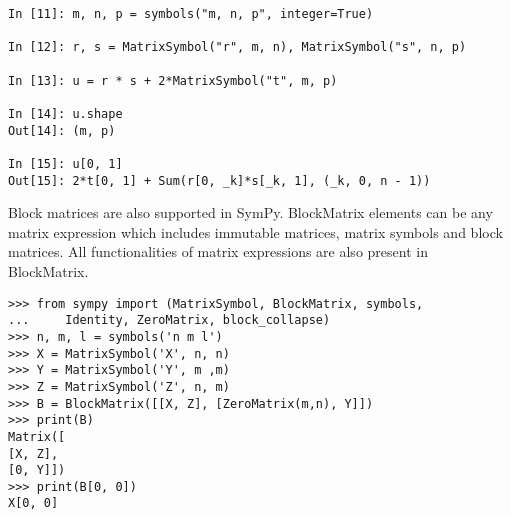 \begin{verbatim}
In [11]: m, n, p = symbols("m, n, p", integer=True)

In [12]: r, s = MatrixSymbol("r", m, n), MatrixSymbol("s", n, p)

In [13]: u = r * s + 2*MatrixSymbol("t", m, p)

In [14]: u.shape
Out[14]: (m, p)

In [15]: u[0, 1]
Out[15]: 2*t[0, 1] + Sum(r[0, _k]*s[_k, 1], (_k, 0, n - 1))
\end{verbatim}

Block matrices are also supported in SymPy. BlockMatrix elements can be
any matrix expression which includes immutable matrices, matrix symbols and
block matrices. All functionalities of matrix expressions are also present in
BlockMatrix.


\begin{verbatim}
>>> from sympy import (MatrixSymbol, BlockMatrix, symbols,
...     Identity, ZeroMatrix, block_collapse)
>>> n, m, l = symbols('n m l')
>>> X = MatrixSymbol('X', n, n)
>>> Y = MatrixSymbol('Y', m ,m)
>>> Z = MatrixSymbol('Z', n, m)
>>> B = BlockMatrix([[X, Z], [ZeroMatrix(m,n), Y]])
>>> print(B)
Matrix([
[X, Z],
[0, Y]])
>>> print(B[0, 0])
X[0, 0]
\end{verbatim}